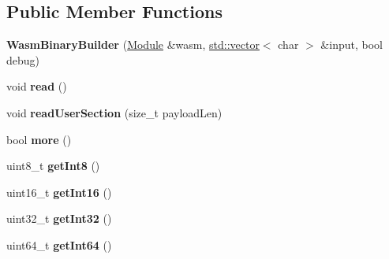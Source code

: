 \subsection*{Public Member Functions}
\begin{DoxyCompactItemize}
\item 
\mbox{\label{classwasm_1_1_wasm_binary_builder_a05259eacfb34ba268695528a0b4a9237}} 
{\bfseries Wasm\+Binary\+Builder} (\mbox{\hyperlink{classwasm_1_1_module}{Module}} \&wasm, \mbox{\hyperlink{classstd_1_1vector}{std\+::vector}}$<$ char $>$ \&input, bool debug)
\item 
\mbox{\label{classwasm_1_1_wasm_binary_builder_a3a60974fbeb8190218c7a7c4c80fcd07}} 
void {\bfseries read} ()
\item 
\mbox{\label{classwasm_1_1_wasm_binary_builder_a536e5522f4a86303ed255c41f9011068}} 
void {\bfseries read\+User\+Section} (size\+\_\+t payload\+Len)
\item 
\mbox{\label{classwasm_1_1_wasm_binary_builder_a7c373d4eebfce912ac880e7daa4fe96a}} 
bool {\bfseries more} ()
\item 
\mbox{\label{classwasm_1_1_wasm_binary_builder_abb05a59cecb6a1e5a2121f45f2405368}} 
uint8\+\_\+t {\bfseries get\+Int8} ()
\item 
\mbox{\label{classwasm_1_1_wasm_binary_builder_ad69e553e9d45354e38b43d306636f8e0}} 
uint16\+\_\+t {\bfseries get\+Int16} ()
\item 
\mbox{\label{classwasm_1_1_wasm_binary_builder_a8f214ecd63c70193c34586cdec4c4d34}} 
uint32\+\_\+t {\bfseries get\+Int32} ()
\item 
\mbox{\label{classwasm_1_1_wasm_binary_builder_af6459b17bc9dfff60a3996be5be85f1b}} 
uint64\+\_\+t {\bfseries get\+Int64} ()
\item 
\mbox{\label{classwasm_1_1_wasm_binary_builder_ac6665b43630a1f47b3df24158cfa08c9}} 

\end{DoxyCompactItemize}
